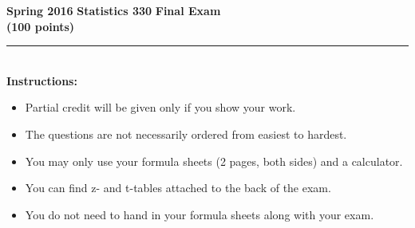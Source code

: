 \documentclass[12pt]{article}
\begin{document}
\begin{center}
  \textbf{\large Spring 2016} \hfill \textbf{\large Statistics 330} \hfill \textbf{\large Final Exam}\\
  \hfill \textbf{(100 points)}
\end{center}
\vspace*{1in}
 \rule{5in}{.01in}\\[1in]
\textbf{Instructions:}\\
\begin{itemize}
\item {\large Partial credit will be given only if you show your work.}
\item {\large The questions are not necessarily ordered from easiest to hardest.}
\item {\large You may only use your formula sheets (2 pages, both sides) and a calculator.}
\item {\large You can find z- and t-tables attached to the back of the exam.}
\item {\large You do not need to hand in your formula sheets along with your exam.}
\end{itemize}
\end{document}
